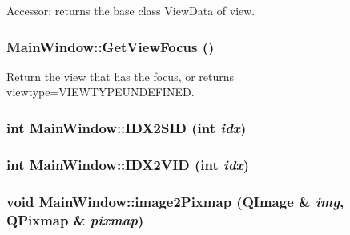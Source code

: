 Accessor: returns the base class ViewData of view. 

\hypertarget{class_main_window_8624537f532fe6c0fe360557e5235774}{
\subsubsection[{GetViewFocus}]{ MainWindow::GetViewFocus ()}}
\label{class_main_window_8624537f532fe6c0fe360557e5235774}


Return the view that has the focus, or returns viewtype=VIEWTYPEUNDEFINED. 

\hypertarget{class_main_window_1bd42b6c8b94406016d733a66b555d04}{
\subsubsection[{IDX2SID}]{\setlength{\rightskip}{0pt plus 5cm}int MainWindow::IDX2SID (int {\em idx})}}
\label{class_main_window_1bd42b6c8b94406016d733a66b555d04}


\hypertarget{class_main_window_37742f5f7a8b4319c4f6cf5f66c190f0}{
\subsubsection[{IDX2VID}]{\setlength{\rightskip}{0pt plus 5cm}int MainWindow::IDX2VID (int {\em idx})}}
\label{class_main_window_37742f5f7a8b4319c4f6cf5f66c190f0}


\hypertarget{class_main_window_1c69f8419d114c0acb6216ac0a17e712}{
\subsubsection[{image2Pixmap}]{\setlength{\rightskip}{0pt plus 5cm}void MainWindow::image2Pixmap (QImage \& {\em img}, \/  QPixmap \& {\em pixmap})}}
\label{class_main_window_1c69f8419d114c0acb6216ac0a17e712}


